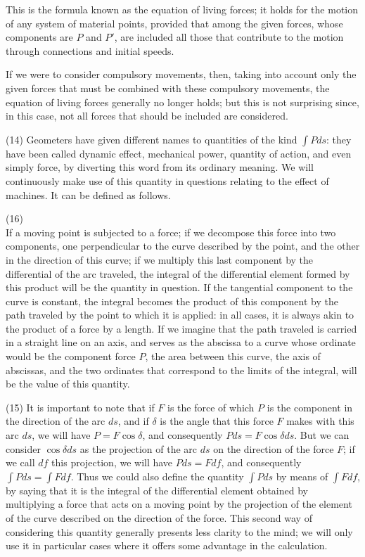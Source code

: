 \documentclass{book}
\begin{document}
This is the formula known as the equation of living forces; it holds for the motion of any system of material points, provided that among the given forces, whose components are \( P \) and \( P' \), are included all those that contribute to the motion through connections and initial speeds.

If we were to consider compulsory movements, then, taking into account only the given forces that must be combined with these compulsory movements, the equation of living forces generally no longer holds; but this is not surprising since, in this case, not all forces that should be included are considered.

(14) Geometers have given different names to quantities of the kind \( \int Pds \): they have been called dynamic effect, mechanical power, quantity of action, and even simply force, by diverting this word from its ordinary meaning. We will continuously make use of this quantity in questions relating to the effect of machines. It can be defined as follows.

\newpage
(16)\\
If a moving point is subjected to a force; if we decompose this force into two components, one perpendicular to the curve described by the point, and the other in the direction of this curve; if we multiply this last component by the differential of the arc traveled, the integral of the differential element formed by this product will be the quantity in question.
If the tangential component to the curve is constant, the integral becomes the product of this component by the path traveled by the point to which it is applied: in all cases, it is always akin to the product of a force by a length.
If we imagine that the path traveled is carried in a straight line on an axis, and serves as the abscissa to a curve whose ordinate would be the component force \(P\), the area between this curve, the axis of abscissas, and the two ordinates that correspond to the limits of the integral, will be the value of this quantity.

(15) It is important to note that if \(F\) is the force of which \(P\) is the component in the direction of the arc \(ds\), and if \(\delta\) is the angle that this force \(F\) makes with this arc \(ds\), we will have \(P = F \cos \delta\), and consequently \(Pds = F \cos \delta ds\). But we can consider \(\cos \delta ds\) as the projection of the arc \(ds\) on the direction of the force \(F\); if we call \(df\) this projection, we will have \(Pds = Fdf\), and consequently \(\int Pds = \int Fdf\). Thus we could also define the quantity \(\int Pds\) by means of \(\int Fdf\), by saying that it is the integral of the differential element obtained by multiplying a force that acts on a moving point by the projection of the element of the curve described on the direction of the force. This second way of considering this quantity generally presents less clarity to the mind; we will only use it in particular cases where it offers some advantage in the calculation.
\end{document}
